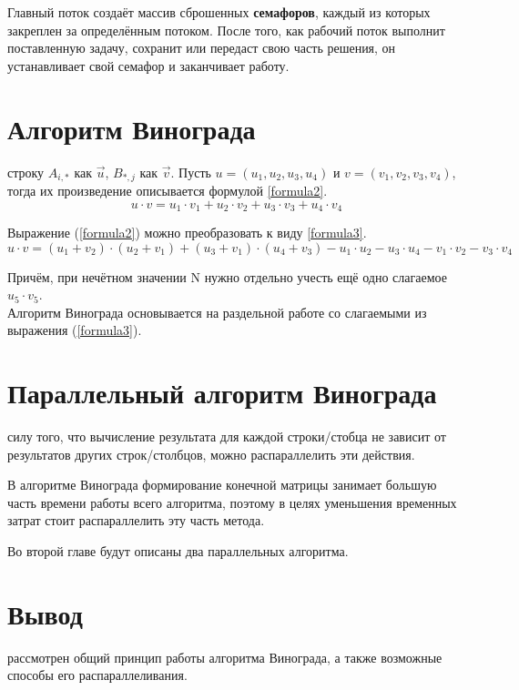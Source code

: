 Главный поток создаёт массив сброшенных \textbf{семафоров}, каждый из которых закреплен за определённым потоком. После того, как рабочий поток выполнит поставленную задачу, сохранит или передаст свою часть решения, он устанавливает свой семафор и заканчивает работу.

\section{Алгоритм Винограда}
 строку $A_{i,*}$ как $\overrightarrow{u}$, $B_{*,j}$ как $\overrightarrow{v}$.
Пусть $u = (u_1, u_2, u_3, u_4)$ и $v = (v_1, v_2, v_3, v_4)$, тогда их произведение описывается формулой \ref{formula2}.
\begin{equation}\label{formula2}
	u \cdot v = u_1 \cdot v_1 + u_2 \cdot v_2 + u_3 \cdot v_3 + u_4 \cdot v_4
\end{equation}

Выражение (\ref{formula2}) можно преобразовать к виду \ref{formula3}.
\begin{equation}\label{formula3}
	u \cdot v = (u_1 + v_2)\cdot(u_2 + v_1) + (u_3 + v_1)\cdot(u_4 + v_3) - u_1\cdot u_2 - u_3\cdot u_4 - v_1\cdot v_2 - v_3\cdot v_4
\end{equation}

Причём, при нечётном значении N нужно отдельно учесть ещё одно слагаемое $u_5 \cdot v_5$. \\

Алгоритм Винограда основывается на раздельной работе со слагаемыми из выражения (\ref{formula3}).

\section{Параллельный алгоритм Винограда}
 силу того, что вычисление результата для каждой строки/стобца не зависит от результатов других строк/столбцов, можно распараллелить эти действия.
 
В алгоритме Винограда формирование конечной матрицы занимает большую часть времени работы всего алгоритма, поэтому в целях уменьшения временных затрат стоит распараллелить эту часть метода.

Во второй главе будут описаны два параллельных алгоритма.

\section*{Вывод}
 рассмотрен общий принцип работы алгоритма Винограда, а также возможные способы его распараллеливания.